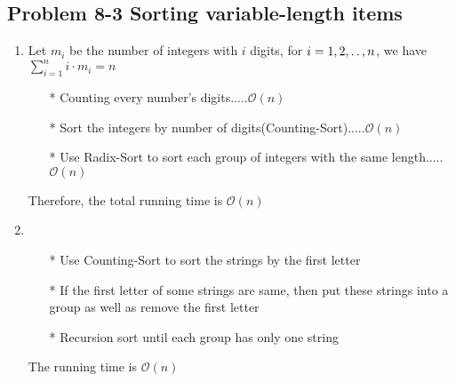 \subsection*{Problem 8-3 Sorting variable-length items}
\begin{enumerate}
	\item	Let $m_i$ be the number of integers with $i$ digits, for $i = 1, 2, \mathinner{\ldotp\ldotp}, n$, we have $\sum_{i = 1}^n i \cdot m_i = n$
		\begin{itemize}
			\item[*]	Counting every number's digits.....$\mathcal{O}(n)$
			\item[*]	Sort the integers by number of digits(Counting-Sort).....$\mathcal{O}(n)$
			\item[*]	Use Radix-Sort to sort each group of integers with the same length.....$\mathcal{O}(n)$
		\end{itemize}
		Therefore, the total running time is $\mathcal{O}(n)$
	\item	\begin{itemize}
			\item[*]	Use Counting-Sort to sort the strings by the first letter
			\item[*]	If the first letter of some strings are same, then put these strings into a group as well as remove the first letter
			\item[*]	Recursion sort until each group has only one string
		\end{itemize}
		The running time is $\mathcal{O}(n)$
\end{enumerate}

